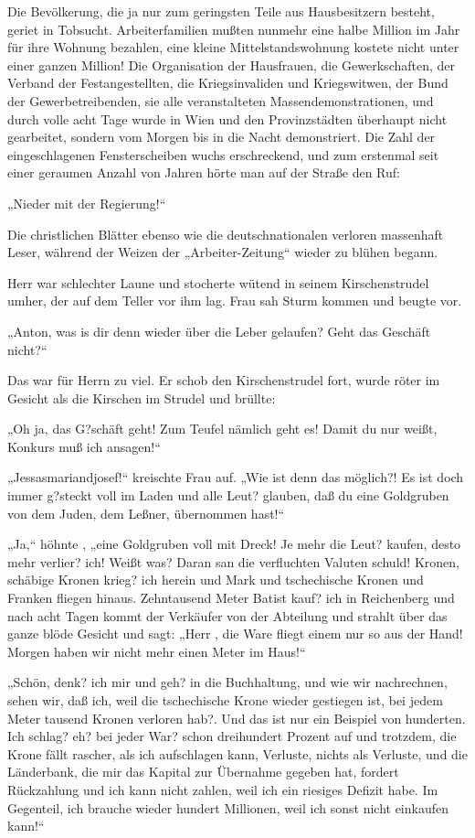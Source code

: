 Die Bevölkerung, die ja nur zum geringsten Teile aus
Hausbesitzern besteht, geriet in Tobsucht. Arbeiterfamilien mußten
nunmehr eine halbe Million im Jahr für ihre Wohnung bezahlen, eine
kleine Mittelstandswohnung kostete nicht unter einer ganzen
Million! Die Organisation der Hausfrauen, die Gewerkschaften, der
Verband der Festangestellten, die Kriegsinvaliden und Kriegswitwen,
der Bund der Gewerbetreibenden, sie alle veranstalteten
Massendemonstrationen, und durch volle acht Tage wurde in Wien und
den Provinzstädten überhaupt nicht gearbeitet, sondern vom Morgen
bis in die Nacht demonstriert. Die Zahl der eingeschlagenen
Fensterscheiben wuchs erschreckend, und zum erstenmal seit einer
geraumen Anzahl von Jahren hörte man auf der Straße den Ruf:

„Nieder mit der Regierung!“

Die christlichen Blätter ebenso wie die deutschnationalen verloren
massenhaft Leser, während der Weizen der „Arbeiter-Zeitung“ wieder
zu blühen begann.

\tb{* * *}
Herr \Zwickerl{} war schlechter Laune und stocherte wütend in seinem
Kirschenstrudel umher, der auf dem Teller vor ihm lag. Frau
\Zwickerl{} sah Sturm kommen und beugte vor.

„Anton, was is dir denn wieder über die Leber gelaufen? Geht das
Geschäft nicht?“

Das war für Herrn \Zwickerl{} zu viel. Er schob den Kirschenstrudel
fort, wurde röter im Gesicht als die Kirschen im Strudel und
brüllte:

„Oh ja, das G?schäft geht! Zum Teufel nämlich geht
es! Damit du nur weißt, Konkurs muß ich ansagen!“

„Jessasmariandjosef!“ kreischte Frau \Zwickerl{} auf. „Wie ist denn
das möglich?! Es ist doch immer g?steckt voll im Laden und alle
Leut? glauben, daß du eine Goldgruben von dem Juden, dem Leßner,
übernommen hast!“

„Ja,“ höhnte \Zwickerl{}, „eine Goldgruben voll mit Dreck! Je mehr die
Leut? kaufen, desto mehr verlier? ich! Weißt was? Daran san die
verfluchten Valuten schuld! Kronen, schäbige Kronen krieg? ich
herein und Mark und tschechische Kronen und Franken fliegen hinaus.
Zehntausend Meter Batist kauf? ich in Reichenberg und nach acht
Tagen kommt der Verkäufer von der Abteilung und strahlt über das
ganze blöde Gesicht und sagt: „Herr \Zwickerl{}, die Ware fliegt einem
nur so aus der Hand! Morgen haben wir nicht mehr einen Meter im
Haus!“

„Schön, denk? ich mir und geh? in die Buchhaltung, und wie wir
nachrechnen, sehen wir, daß ich, weil die tschechische Krone wieder
gestiegen ist, bei jedem Meter tausend Kronen verloren hab?. Und
das ist nur ein Beispiel von hunderten. Ich schlag? eh? bei jeder
War? schon dreihundert Prozent auf und trotzdem, die Krone fällt
rascher, als ich aufschlagen kann, Verluste, nichts als Verluste,
und die Länderbank, die mir das Kapital zur Übernahme gegeben hat,
fordert Rückzahlung und ich kann nicht zahlen, weil ich ein
riesiges Defizit habe. Im Gegenteil, ich brauche wieder hundert
Millionen, weil ich sonst nicht einkaufen kann!“

